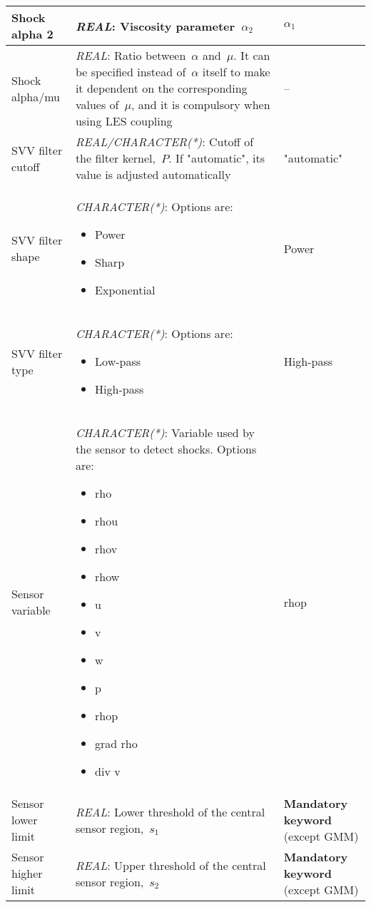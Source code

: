 \documentclass[a4paper,10pt]{report}
\begin{document}
\begin{longtable}{|l|p{10cm}|p{2.2cm}|}
Shock alpha 2 & \textit{REAL}: Viscosity parameter~$\alpha_2$ & $\alpha_1$ \\ \hline
Shock alpha/mu & \textit{REAL}: Ratio between~$\alpha$ and~$\mu$. It can be specified instead of~$\alpha$ itself to make it dependent on the corresponding values of~$\mu$, and it is compulsory when using LES coupling & -- \\ \hline
SVV filter cutoff & \textit{REAL/CHARACTER(*)}: Cutoff of the filter kernel,~$P$. If "automatic", its value is adjusted automatically & "automatic" \\ \hline
SVV filter shape & \textit{CHARACTER(*)}: Options are:
    \begin{itemize}
        \item Power
        \item Sharp
        \item Exponential
    \end{itemize} & Power \\ \hline
SVV filter type & \textit{CHARACTER(*)}: Options are:
    \begin{itemize}
        \item Low-pass
        \item High-pass
    \end{itemize} & High-pass \\ \hline
Sensor variable & \textit{CHARACTER(*)}: Variable used by the sensor to detect shocks. Options are:
    \begin{itemize}
        \item rho
        \item rhou
        \item rhov
        \item rhow
        \item u
        \item v
        \item w
        \item p
        \item rhop
        \item grad rho
        \item div v
    \end{itemize} & rhop \\ \hline
Sensor lower limit & \textit{REAL}: Lower threshold of the central sensor region,~$s_1$  & \textbf{Mandatory keyword} (except GMM) \\ \hline
Sensor higher limit & \textit{REAL}: Upper threshold of the central sensor region,~$s_2$ & \textbf{Mandatory keyword} (except GMM) \\ \hline

\end{longtable}
\end{document}
